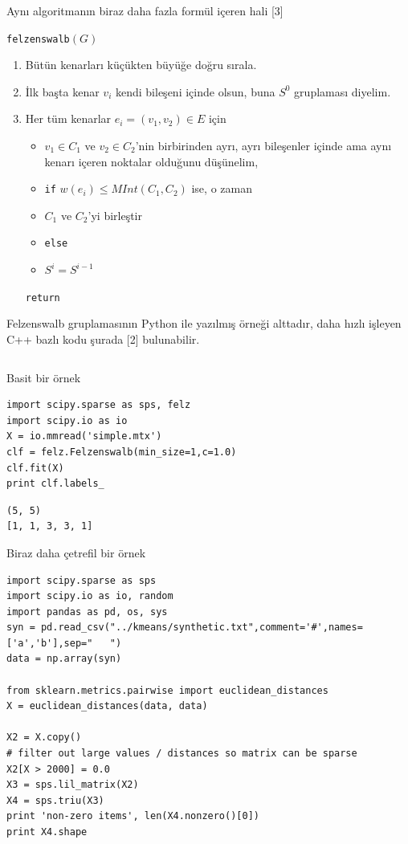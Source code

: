 \documentclass[12pt,fleqn]{article}\usepackage{../../common}
\begin{document}
Aynı algoritmanın biraz daha fazla formül içeren hali [3]

\verb!felzenswalb!$\left(G\right)$
\begin{enumerate}
  \item Bütün kenarları küçükten büyüğe doğru sırala.
  \item İlk başta kenar $v_i$ kendi bileşeni içinde olsun, buna $S^0$ gruplaması diyelim.
  \item Her tüm kenarlar $e_i = (v_1,v_2) \in E$ için
    \begin{itemize}
    \item $v_1 \in C_1$ ve $v_2 \in C_2$'nin birbirinden ayrı, ayrı
      bileşenler içinde ama aynı kenarı içeren noktalar olduğunu düşünelim,
    \item \verb!if! $w(e_i) \le MInt(C_1,C_2)$ ise, o zaman
    \item  $C_1$ ve $C_2$'yi birleştir
    \item \verb!else!
    \item $S^i = S^{i-1}$ 
   \end{itemize}
   \verb!return!
\end{enumerate}

Felzenswalb gruplamasının Python ile yazılmış örneği alttadır, daha hızlı
işleyen C++ bazlı kodu şurada [2] bulunabilir.

\inputminted[fontsize=\footnotesize]{python}{felz.py}

Basit bir örnek

\begin{verbatim}
import scipy.sparse as sps, felz
import scipy.io as io
X = io.mmread('simple.mtx')
clf = felz.Felzenswalb(min_size=1,c=1.0)
clf.fit(X)
print clf.labels_    
\end{verbatim}

\begin{verbatim}
(5, 5)
[1, 1, 3, 3, 1]
\end{verbatim}

Biraz daha çetrefil bir örnek

\begin{verbatim}
import scipy.sparse as sps
import scipy.io as io, random
import pandas as pd, os, sys
syn = pd.read_csv("../kmeans/synthetic.txt",comment='#',names=['a','b'],sep="   ")
data = np.array(syn)

from sklearn.metrics.pairwise import euclidean_distances
X = euclidean_distances(data, data)

X2 = X.copy()
# filter out large values / distances so matrix can be sparse
X2[X > 2000] = 0.0
X3 = sps.lil_matrix(X2)
X4 = sps.triu(X3)
print 'non-zero items', len(X4.nonzero()[0])
print X4.shape
\end{verbatim}
\end{document}
